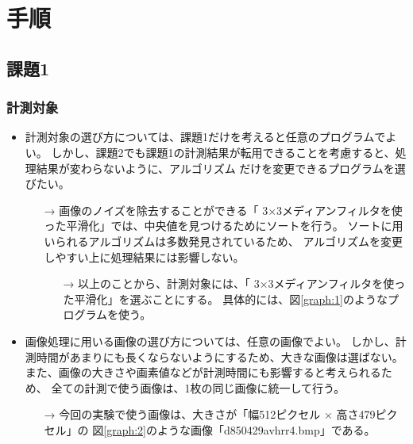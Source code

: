 \section{手順}
\subsection{課題1}
\subsubsection{計測対象}
\begin{itemize}
  \item 計測対象の選び方については、課題1だけを考えると任意のプログラムでよい。
  しかし、課題2でも課題1の計測結果が転用できることを考慮すると、処理結果が変わらないように、アルゴリズム
  だけを変更できるプログラムを選びたい。
  \begin{itemize}
    \item[→] 画像のノイズを除去することができる「
    3×3メディアンフィルタを使った平滑化」では、中央値を見つけるためにソートを行う。
    ソートに用いられるアルゴリズムは多数発見されているため、
    アルゴリズムを変更しやすい上に処理結果には影響しない。
    \begin{itemize}
      \item[→] 以上のことから、計測対象には、「
      3×3メディアンフィルタを使った平滑化」を選ぶことにする。
      具体的には、図\ref{graph:1}のようなプログラムを使う。
    \end{itemize}
  \end{itemize}
\end{itemize}
\begin{itemize}
  \item 画像処理に用いる画像の選び方については、任意の画像でよい。
  しかし、計測時間があまりにも長くならないようにするため、大きな画像は選ばない。
  また、画像の大きさや画素値などが計測時間にも影響すると考えられるため、
  全ての計測で使う画像は、1枚の同じ画像に統一して行う。
  \begin{itemize}
    \item[→] 今回の実験で使う画像は、大きさが「幅512ピクセル × 高さ479ピクセル」の
    図\ref{graph:2}のような画像「d850429avhrr4.bmp」である。
  \end{itemize}
\end{itemize}

